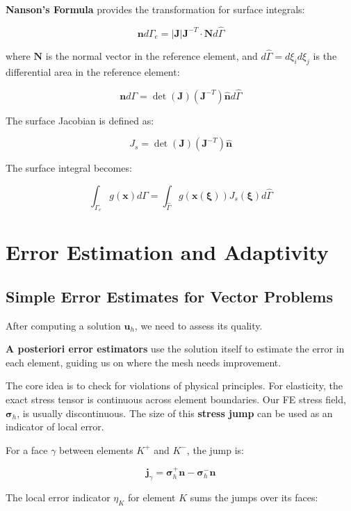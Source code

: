 \documentclass[
  11pt,
  a4paper,
]{scrbook}
\begin{document}
\textbf{Nanson's Formula} provides the transformation for surface
integrals:

\[\boldsymbol{n}d\Gamma_e = |\boldsymbol{J}|\boldsymbol{J}^{-T}\cdot \boldsymbol{N} d\hat{\Gamma}\]

where \(\boldsymbol{N}\) is the normal vector in the reference element,
and \(d\hat{\Gamma}=d\xi_i d\xi_j\) is the differential area in the
reference element:

\[\mathbf{n} d\Gamma = \det(\mathbf{J}) (\mathbf{J}^{-T}) \hat{\mathbf{n}}  d\hat{\Gamma}\]

The surface Jacobian is defined as:

\[J_s =  \det(\mathbf{J}) (\mathbf{J}^{-T}) \hat{\mathbf{n}}\]

The surface integral becomes:

\[\int_{\Gamma_e} g(\mathbf{x})  d\Gamma = \int_{\hat{\Gamma}} g(\mathbf{x}(\boldsymbol{\xi})) J_s(\boldsymbol{\xi})  d\hat{\Gamma}\]

\chapter{Error Estimation and
Adaptivity}\label{error-estimation-and-adaptivity}

\section{Simple Error Estimates for Vector
Problems}\label{simple-error-estimates-for-vector-problems}

After computing a solution \(\mathbf{u}_h\), we need to assess its
quality.

\textbf{A posteriori error estimators} use the solution itself to
estimate the error in each element, guiding us on where the mesh needs
improvement.

The core idea is to check for violations of physical principles. For
elasticity, the exact stress tensor is continuous across element
boundaries. Our FE stress field, \(\boldsymbol{\sigma}_h\), is usually
discontinuous. The size of this \textbf{stress jump} can be used as an
indicator of local error.

For a face \(\gamma\) between elements \(K^+\) and \(K^-\), the jump is:

\[\mathbf{j}_{\gamma} = \boldsymbol{\sigma}_h^+ \mathbf{n} - \boldsymbol{\sigma}_h^- \mathbf{n}\]

The local error indicator \(\eta_K\) for element \(K\) sums the jumps
over its faces:
\end{document}
